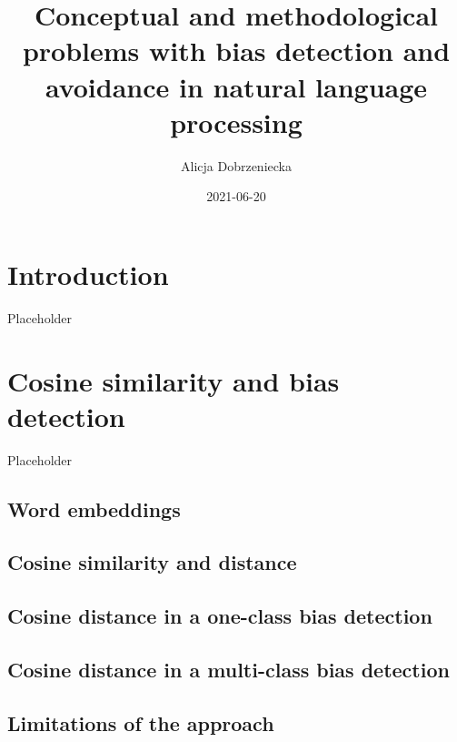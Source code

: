 \documentclass[
  12pt,
]{book}
\title{Conceptual and methodological problems with bias detection and avoidance in natural language processing}
\author{Alicja Dobrzeniecka}
\date{2021-06-20}
\begin{document}
\maketitle

{
\setcounter{tocdepth}{5}
\tableofcontents
}
\hypertarget{introduction}{%
\chapter{Introduction}\label{introduction}}

Placeholder

\hypertarget{cosine-similarity-and-bias-detection}{%
\chapter{Cosine similarity and bias detection}\label{cosine-similarity-and-bias-detection}}

Placeholder

\hypertarget{word-embeddings}{%
\section{Word embeddings}\label{word-embeddings}}

\hypertarget{cosine-similarity-and-distance}{%
\section{Cosine similarity and distance}\label{cosine-similarity-and-distance}}

\hypertarget{cosine-distance-in-a-one-class-bias-detection}{%
\section{Cosine distance in a one-class bias detection}\label{cosine-distance-in-a-one-class-bias-detection}}

\hypertarget{cosine-distance-in-a-multi-class-bias-detection}{%
\section{Cosine distance in a multi-class bias detection}\label{cosine-distance-in-a-multi-class-bias-detection}}

\hypertarget{limitations-of-the-approach}{%
\section{Limitations of the approach}\label{limitations-of-the-approach}}
\end{document}
